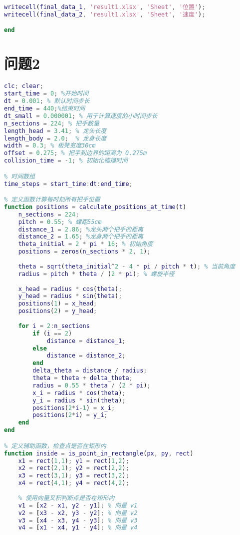 \documentclass[withoutpreface,bwprint]{cumcmthesis1} %
\begin{document}
\begin{appendices}
\begin{lstlisting}[language=matlab]
% 保存到Excel文件，位置数据到第一页，速度数据到第二页
writecell(final_data_1, 'result1.xlsx', 'Sheet', '位置');
writecell(final_data_2, 'result1.xlsx', 'Sheet', '速度');

end
 \end{lstlisting}

\section{\textbf{问题2}}
\begin{lstlisting}[language=matlab]
clc; clear;
start_time = 0; %开始时间
dt = 0.001; % 默认时间步长
end_time = 440;%结束时间
dt_small = 0.000001; % 用于计算速度的小时间步长
n_sections = 224; % 把手数量
length_head = 3.41; % 龙头长度
length_body = 2.0;  % 龙身长度
width = 0.3; % 板凳宽度30cm
offset = 0.275; % 把手到边界的距离为 0.275m
collision_time = -1; % 初始化碰撞时间

% 时间数组
time_steps = start_time:dt:end_time;

% 定义函数计算每时刻所有把手位置
function positions = calculate_positions_at_time(t)
    n_sections = 224;
    pitch = 0.55; % 螺距55cm
    distance_1 = 2.86; %龙头两个把手的距离
    distance_2 = 1.65; %龙身两个把手的距离
    theta_initial = 2 * pi * 16; % 初始角度
    positions = zeros(n_sections * 2, 1);
    
    theta = sqrt(theta_initial^2 - 4 * pi / pitch * t); % 当前角度
    radius = pitch * theta / (2 * pi); % 螺旋半径
    
    x_head = radius * cos(theta); 
    y_head = radius * sin(theta);
    positions(1) = x_head;
    positions(2) = y_head;
    
    for i = 2:n_sections
        if (i == 2)
            distance = distance_1;
        else
            distance = distance_2;
        end
        delta_theta = distance / radius;
        theta = theta + delta_theta;
        radius = 0.55 * theta / (2 * pi);
        x_i = radius * cos(theta);
        y_i = radius * sin(theta);
        positions(2*i-1) = x_i;
        positions(2*i) = y_i;
    end
end

% 定义辅助函数，检查点是否在矩形内
function inside = is_point_in_rectangle(px, py, rect)
    x1 = rect(1,1); y1 = rect(1,2);
    x2 = rect(2,1); y2 = rect(2,2);
    x3 = rect(3,1); y3 = rect(3,2);
    x4 = rect(4,1); y4 = rect(4,2);
    
    % 使用向量叉积判断点是否在矩形内
    v1 = [x2 - x1, y2 - y1]; % 向量 v1
    v2 = [x3 - x2, y3 - y2]; % 向量 v2
    v3 = [x4 - x3, y4 - y3]; % 向量 v3
    v4 = [x1 - x4, y1 - y4]; % 向量 v4
    

\end{lstlisting}
\end{appendices}
\end{document}
